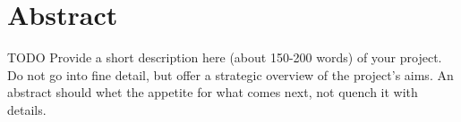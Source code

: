 \chapter*{Abstract}

TODO Provide a short description here (about 150-200 words) of your project. Do not go into fine detail, but offer a strategic overview of the project’s aims. An abstract should whet the appetite for what comes next, not quench it with details.
